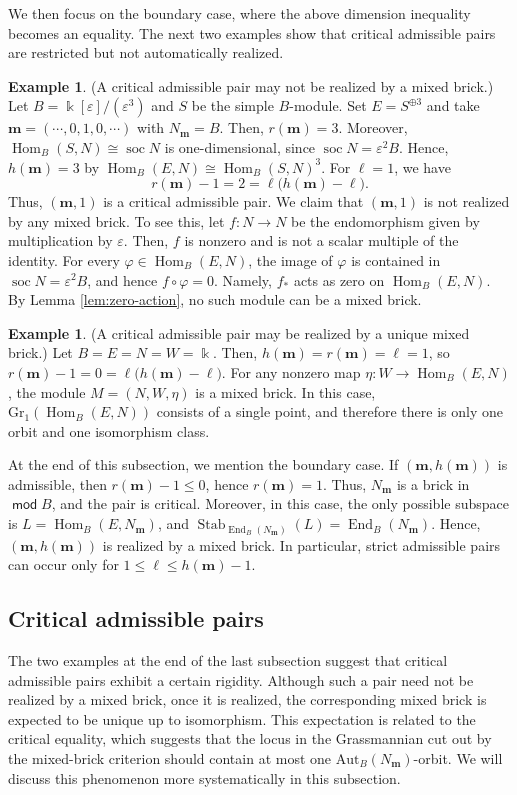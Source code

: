 \documentclass[a4,12pt]{amsart}
\numberwithin{equation}{section} %
\def\Hom{\operatorname{Hom}} %
\def\End{\operatorname{End}} %
\def\soc{\operatorname{soc}} %
\def\Stab{\operatorname{Stab}} %
\def\mod{\operatorname{\mathsf{mod}}}
\def\Gr{\mathrm{Gr}} %
\def\Aut{\mathrm{Aut}} %
\theoremstyle{definition} %
\newtheorem{example}[theorem]{Example} %
\begin{document}
We then focus on the boundary case, where the above dimension inequality becomes an equality. The next two examples show that critical admissible pairs are restricted but not automatically realized.

\begin{example}\label{ex:critical-unrealized}
(A critical admissible pair may not be realized by a mixed brick.)
Let $B=\Bbbk[\varepsilon]/(\varepsilon^3)$ and $S$ be the simple $B$-module. Set $E=S^{\oplus 3}$ and take $\mathbf{m}=(\cdots, 0, 1,0,\cdots)$ with $N_{\mathbf{m}}=B$. Then, $r(\mathbf{m})=3$.
Moreover, $\Hom_B(S,N)\cong\soc N$ is one-dimensional, since $\soc N=\varepsilon^2B$.
Hence, $h(\mathbf{m})=3$ by $\Hom_B(E,N)\cong\Hom_B(S,N)^3$. For $\ell=1$, we have
\[
r(\mathbf{m})-1=2=\ell\bigl(h(\mathbf{m})-\ell\bigr).
\]
Thus, $(\mathbf{m},1)$ is a critical admissible pair. We claim that $(\mathbf{m},1)$ is not realized by any mixed brick. To see this, let $f\colon N\to N$ be the endomorphism given by multiplication by $\varepsilon$. Then, $f$ is nonzero and is not a scalar multiple of the identity. For every $\varphi\in\Hom_B(E,N)$, the image of $\varphi$ is contained in $\soc N=\varepsilon^2B$, and hence $f\circ\varphi=0$.
Namely, $f_*$ acts as zero on $\Hom_B(E,N)$.
By Lemma \ref{lem:zero-action}, no such module can be a mixed brick.
\end{example}


\begin{example}
(A critical admissible pair may be realized by a unique mixed brick.)
Let $B=E=N=W=\Bbbk$. Then, $h(\mathbf{m})=r(\mathbf{m})=\ell=1$, so $r(\mathbf{m})-1=0=\ell\bigl(h(\mathbf{m})-\ell\bigr)$. For any nonzero map $\eta\colon W\to\Hom_B(E,N)$, the module $M=(N,W,\eta)$ is a mixed brick. In this case, $\Gr_1(\Hom_B(E,N))$ consists of a single point, and therefore there is only one orbit and one isomorphism class.
\end{example}

At the end of this subsection, we mention the boundary case. If $(\mathbf{m},h(\mathbf{m}))$ is admissible, then $r(\mathbf{m})-1\leq0$, hence $r(\mathbf{m})=1$. Thus, $N_{\mathbf{m}}$ is a brick in $\mod B$, and the pair is critical.
Moreover, in this case, the only possible subspace is $L=\Hom_B(E,N_{\mathbf{m}})$, and $\Stab_{\End_B(N_{\mathbf{m}})}(L)=\End_B(N_{\mathbf{m}})$. Hence, $(\mathbf{m},h(\mathbf{m}))$ is realized by a mixed brick. In particular, strict admissible pairs can occur only for $1\leq\ell\leq h(\mathbf{m})-1$.

\subsection{Critical admissible pairs}
The two examples at the end of the last subsection suggest that critical admissible pairs exhibit a certain rigidity. Although such a pair need not be realized by a mixed brick, once it is realized, the corresponding mixed brick is expected to be unique up to isomorphism. This expectation is related to the critical equality, which suggests that the locus in the Grassmannian cut out by the mixed-brick criterion should contain at most one $\Aut_B(N_{\mathbf{m}})$-orbit. We will discuss this phenomenon more systematically in this subsection.
\end{document}
